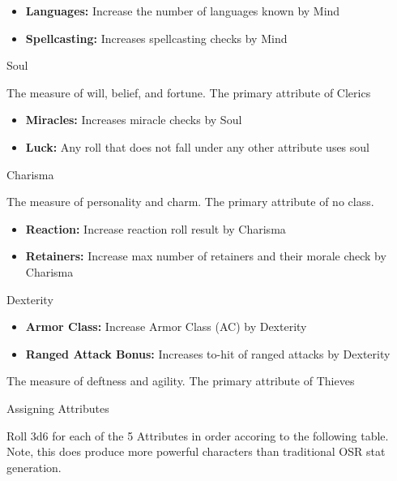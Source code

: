 \begin{multicols}{2}
\begin{itemize}
\setlength\itemsep{0em}
	\item \textbf{Languages:} Increase the number of languages known by Mind
	\item \textbf{Spellcasting:} Increases spellcasting checks by Mind
\end{itemize}

\begin{mercHeading}
Soul
\end{mercHeading}
The measure of will, belief, and fortune. The primary attribute of Clerics

\begin{itemize}
\setlength\itemsep{0em}
	\item \textbf{Miracles:} Increases miracle checks by Soul
	\item \textbf{Luck:} Any roll that does not fall under any other attribute uses soul
\end{itemize}

\begin{mercHeading}
Charisma
\end{mercHeading}
The measure of personality and charm. The primary attribute of no class.

\begin{itemize}
\setlength\itemsep{0em}
	\item \textbf{Reaction:} Increase reaction roll result by Charisma
	\item \textbf{Retainers:} Increase max number of retainers and their morale check by Charisma
\end{itemize}

\begin{mercHeading}
Dexterity
\end{mercHeading}

\begin{itemize}
\setlength\itemsep{0em}
	\item \textbf{Armor Class:} Increase Armor Class (AC) by Dexterity
	\item \textbf{Ranged Attack Bonus:} Increases to-hit of ranged attacks by Dexterity
\end{itemize}
The measure of deftness and agility. The primary attribute of Thieves

\begin{mercHeading}
Assigning Attributes
\end{mercHeading}

Roll 3d6 for each of the 5 Attributes in order accoring to the following table. Note, this does produce more powerful characters than traditional OSR stat generation.



\end{multicols}
